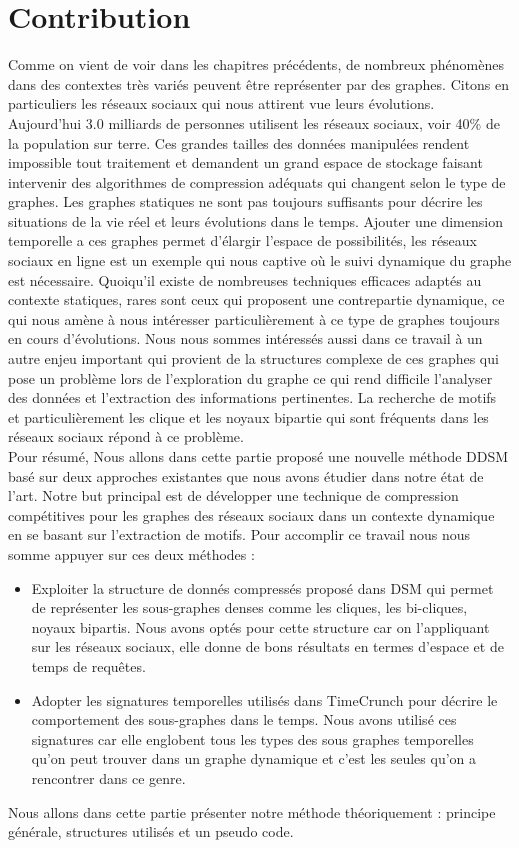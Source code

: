 \documentclass[a4paper,oneside,12pt]{report}
\theoremstyle{definition}
\begin{document}
	\chapter{Contribution}
		Comme on vient de voir dans les chapitres précédents, de nombreux phénomènes dans des contextes très variés peuvent être représenter par des graphes. Citons en particuliers les réseaux sociaux qui nous attirent vue leurs évolutions. Aujourd'hui 3.0 milliards de personnes utilisent les réseaux sociaux, voir 40\% de la population sur terre. Ces grandes tailles des données manipulées rendent impossible tout traitement et demandent un grand espace de stockage faisant intervenir des algorithmes de compression adéquats qui changent selon le type de graphes. Les graphes statiques ne sont pas toujours suffisants pour décrire les situations de la vie réel et leurs évolutions dans le temps. Ajouter une dimension temporelle a ces graphes permet d'élargir l'espace de possibilités, les réseaux sociaux en ligne est un exemple qui nous captive où le suivi dynamique du graphe est nécessaire. Quoiqu'il existe de nombreuses techniques efficaces adaptés au contexte statiques, rares sont ceux qui proposent une contrepartie dynamique, ce qui nous amène à nous intéresser particulièrement à ce type de graphes toujours en cours d'évolutions. Nous nous sommes intéressés aussi dans ce travail à un autre enjeu important qui provient de la structures complexe de ces graphes qui pose un problème lors de l'exploration du graphe ce qui rend difficile l'analyser des données et l'extraction des informations pertinentes. La recherche de motifs et particulièrement les clique et les noyaux bipartie qui sont fréquents dans les réseaux sociaux répond à ce problème.\\
Pour résumé, Nous allons dans cette partie proposé une nouvelle méthode DDSM basé sur deux approches existantes que nous avons étudier dans notre état de l'art. Notre but principal est de développer une technique de compression compétitives pour les graphes des réseaux sociaux dans un contexte dynamique en se basant sur l'extraction de motifs. Pour accomplir ce travail nous nous somme appuyer sur ces deux méthodes :
\begin{itemize}
\item Exploiter la structure de donnés compressés proposé dans DSM \citep{hernandez2014compressed} qui permet de représenter les sous-graphes denses comme les cliques, les bi-cliques, noyaux bipartis. Nous avons optés pour cette structure car on l'appliquant sur les réseaux sociaux, elle donne de bons résultats en termes d'espace et de temps de requêtes.  
\item Adopter les signatures temporelles utilisés dans TimeCrunch \citep{shah2015timecrunch} pour décrire le comportement des sous-graphes dans le temps. Nous avons utilisé ces signatures car elle englobent tous les types des sous graphes temporelles qu'on peut trouver dans un graphe dynamique et c'est les seules qu'on a rencontrer dans ce genre.
\end{itemize}	
Nous allons dans cette partie présenter notre méthode théoriquement : principe générale, structures utilisés et un pseudo code.	
\end{document}
